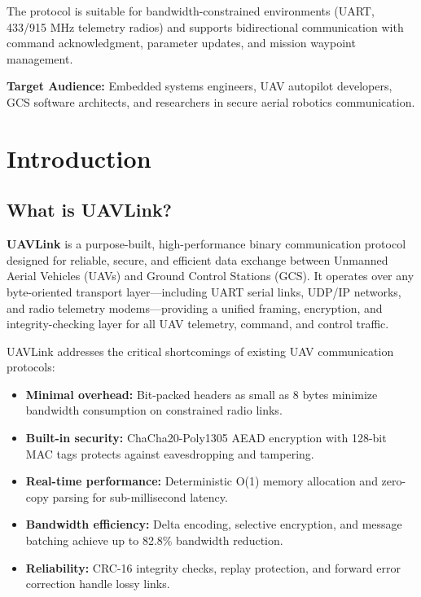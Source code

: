 \documentclass[11pt,a4paper]{article}
\begin{document}
\vspace{0.5cm}

The protocol is suitable for bandwidth-constrained environments (UART, 433/915 MHz telemetry radios) and supports bidirectional communication with command acknowledgment, parameter updates, and mission waypoint management.

\vspace{0.5cm}

\textbf{Target Audience:} Embedded systems engineers, UAV autopilot developers, GCS software architects, and researchers in secure aerial robotics communication.

\newpage

\section{Introduction}

\subsection{What is UAVLink?}

\textbf{UAVLink} is a purpose-built, high-performance binary communication protocol designed for reliable, secure, and efficient data exchange between Unmanned Aerial Vehicles (UAVs) and Ground Control Stations (GCS). It operates over any byte-oriented transport layer---including UART serial links, UDP/IP networks, and radio telemetry modems---providing a unified framing, encryption, and integrity-checking layer for all UAV telemetry, command, and control traffic.

UAVLink addresses the critical shortcomings of existing UAV communication protocols:
\begin{itemize}[noitemsep]
    \item \textbf{Minimal overhead:} Bit-packed headers as small as 8 bytes minimize bandwidth consumption on constrained radio links.
    \item \textbf{Built-in security:} ChaCha20-Poly1305 AEAD encryption with 128-bit MAC tags protects against eavesdropping and tampering.
    \item \textbf{Real-time performance:} Deterministic O(1) memory allocation and zero-copy parsing for sub-millisecond latency.
    \item \textbf{Bandwidth efficiency:} Delta encoding, selective encryption, and message batching achieve up to 82.8\% bandwidth reduction.
    \item \textbf{Reliability:} CRC-16 integrity checks, replay protection, and forward error correction handle lossy links.
\end{itemize}
\end{document}
